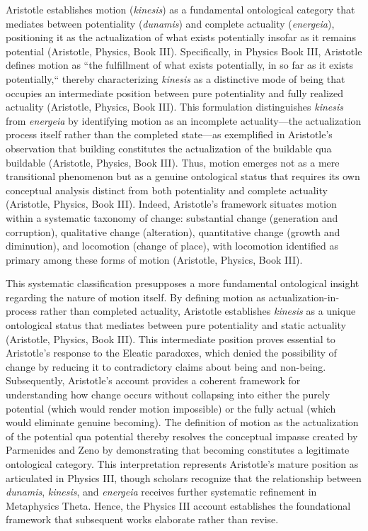 \documentclass[12pt,a4paper]{article}
\begin{document}
Aristotle establishes motion (\textit{kinesis}) as a fundamental ontological category that mediates between potentiality (\textit{dunamis}) and complete actuality (\textit{energeia}), positioning it as the actualization of what exists potentially insofar as it remains potential (Aristotle, Physics, Book III). Specifically, in Physics Book III, Aristotle defines motion as ``the fulfillment of what exists potentially, in so far as it exists potentially,`` thereby characterizing \textit{kinesis} as a distinctive mode of being that occupies an intermediate position between pure potentiality and fully realized actuality (Aristotle, Physics, Book III). This formulation distinguishes \textit{kinesis} from \textit{energeia} by identifying motion as an incomplete actuality—the actualization process itself rather than the completed state—as exemplified in Aristotle's observation that building constitutes the actualization of the buildable qua buildable (Aristotle, Physics, Book III). Thus, motion emerges not as a mere transitional phenomenon but as a genuine ontological status that requires its own conceptual analysis distinct from both potentiality and complete actuality (Aristotle, Physics, Book III). Indeed, Aristotle's framework situates motion within a systematic taxonomy of change: substantial change (generation and corruption), qualitative change (alteration), quantitative change (growth and diminution), and locomotion (change of place), with locomotion identified as primary among these forms of motion (Aristotle, Physics, Book III).

This systematic classification presupposes a more fundamental ontological insight regarding the nature of motion itself. By defining motion as actualization-in-process rather than completed actuality, Aristotle establishes \textit{kinesis} as a unique ontological status that mediates between pure potentiality and static actuality (Aristotle, Physics, Book III). This intermediate position proves essential to Aristotle's response to the Eleatic paradoxes, which denied the possibility of change by reducing it to contradictory claims about being and non-being. Subsequently, Aristotle's account provides a coherent framework for understanding how change occurs without collapsing into either the purely potential (which would render motion impossible) or the fully actual (which would eliminate genuine becoming). The definition of motion as the actualization of the potential qua potential thereby resolves the conceptual impasse created by Parmenides and Zeno by demonstrating that becoming constitutes a legitimate ontological category. This interpretation represents Aristotle's mature position as articulated in Physics III, though scholars recognize that the relationship between \textit{dunamis}, \textit{kinesis}, and \textit{energeia} receives further systematic refinement in Metaphysics Theta. Hence, the Physics III account establishes the foundational framework that subsequent works elaborate rather than revise.
\end{document}
